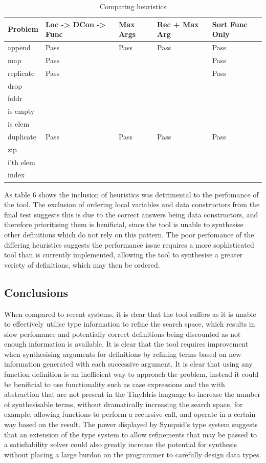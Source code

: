 \documentclass[a4paper]{article}
\begin{document}
\begin{table}[!htb]
  \begin{center}
\begin{tabular}{|l|l|l|l|l|}
\hline
Problem & Loc -> DCon -> Func & Max Args & Rec + Max Arg & Sort Func Only\\
\hline
append & Pass & Pass & Pass & Pass\\
map & Pass  & & & Pass\\
replicate & Pass & & & Pass\\
drop &   & & & \\
foldr &   & & & \\
is empty &   & & & \\
is elem &   &  & & \\
duplicate & Pass & Pass & Pass & Pass\\
zip &   & & & \\
i'th elem &  & & & \\ 
index &   &  & & \\
\hline
\end{tabular}
\caption{Comparing heuristics}
\end{center}
\end{table}

As table 6 shows the inclusion of heuristics was detrimental to the
perfomance of the tool. The exclusion of ordering local variables
and data constructors from the final test suggests this is due to
the correct answers being data constructors, and therefore prioritising
them is benificial, since the tool is unable to synthesise other definitions
which do not rely on this pattern. The poor perfomance of the differing
heuristics suggests the performance issue requires a more sophisticated tool
than is currently implemented, allowing the tool to synthesise a greater
veriety of definitions, which may then be ordered. 

\subsection{Conclusions}
When compared to recent systems, it is clear that the tool suffers as it is
unable to effectively utilise type information to refine the search space,
which results in slow perfomance and potentially correct definitions being
discounted as not enough information is available. It is clear that the tool
requires improvement when synthesising arguments for definitions by refining
terms based on new information generated with each successive argument. It is
clear that using any function definition is an inefficient way to approach the
problem, instead it could be benificial to use functionality such as case
expressions and the with abstraction that are not present in the TinyIdris
language to increase the number of synthesisable terms, without dramatically
increasing the search space, for example, allowing functions to perform a recursive call,
and operate in a certain way based on the result. The power displayed by Synquid's
type system suggests that an extension of the type system to allow refinements that
may be passed to a satisfiability solver could also greatly increase the potential
for synthesis without placing a large burdon on the programmer to carefully design
data types.
\end{document}
